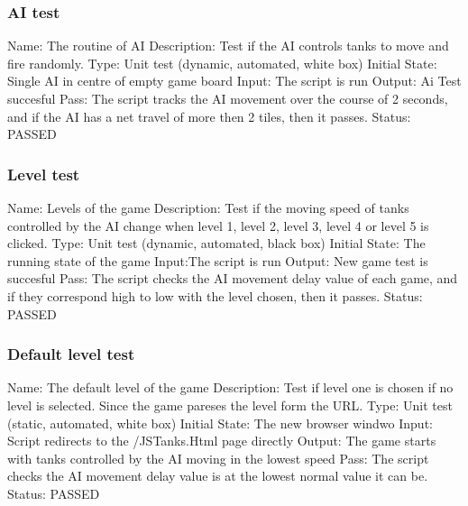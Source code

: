 \documentclass{article}
\begin{document}
\subsubsection{AI test}
\label{sec:3.1.11}
Name:  The routine of AI\newline
Description: Test if the AI controls tanks to move and fire randomly. \newline
Type: Unit test (dynamic, automated, white box) \newline
Initial State: Single AI in centre of empty game board \newline
Input: The script is run \newline
Output: Ai Test succesful \newline
Pass: The script tracks the AI movement over the course of 2 seconds,
and if the AI has a net travel of more then 2 tiles, then it passes.
 \newline
 \newline Status: PASSED

\subsubsection{Level test}
\label{sec:3.1.12}
Name:  Levels of the game\newline
Description: Test if the moving speed of tanks controlled by the AI change 
when level 1, level 2, level 3, level 4 or level 5 is clicked. \newline
Type: Unit test (dynamic, automated, black box) \newline
Initial State:  The running state of the game \newline
Input:The script is run\newline
Output: New game test is succesful\newline
Pass: The script checks the AI movement delay value of each game, 
and if they correspond high to low with the level chosen, then it passes.
 \newline
 \newline Status: PASSED

\subsubsection{Default level test}
\label{sec:3.1.13}
Name:  The default level of the game\newline
Description: Test if level one is chosen if no level is selected. Since the
game pareses the level form the URL.  \newline
Type: Unit test (static, automated, white box) \newline
Initial State: The new browser windwo \newline
Input: Script redirects to the /JSTanks.Html page directly \newline
Output: The game starts with tanks controlled by the AI moving in the lowest 
speed\newline
Pass: The script checks the AI movement delay value is at the lowest normal
 value it can be.\newline
 \newline Status: PASSED
\end{document}
